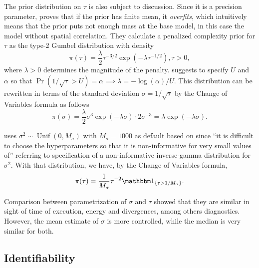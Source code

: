 The prior distribution on $\tau$ is also subject to discussion. Since it is a
precision parameter, \textcite[p. 9, Theorem 1]{simpson2017penalising} proves
that if the prior has finite mean, it {\em overfits}, which intuitively means
that the prior puts not enough mass at the base model, in this case the model
without spatial correlation. They calculate a penalized complexity prior for
$\tau$ as the type-2 Gumbel distribution with density 
\begin{equation}
  \label{eq:gumbel-distribution}
  \pi(\tau) = \frac{\lambda}{2}\tau^{-3/2}\exp(-\lambda \tau^{-1/2}), \tau > 0, 
\end{equation}
where $\lambda > 0$ determines the magnitude of the penalty.
\textcite[p. 9]{simpson2017penalising} suggests to specify $U$ and
$\alpha$ so that $\Pr(1 / \sqrt{\tau} > U) = \alpha \implies \lambda =
-\log(\alpha)/U$. This distribution can be rewritten in terms of the standard
deviation $\sigma = 1/ \sqrt{\tau}$ by the Change of Variables
formula as follows
\begin{equation}
  \label{eq:standard-deviation-gumbel}
  \pi(\sigma) = \frac{\lambda}{2}\sigma^{3}\exp(-\lambda \sigma) \cdot 2\sigma^{-3} = \lambda \exp(-\lambda \sigma). 
\end{equation}

\textcite[p. 5]{lee2013carbayes} uses $\sigma^2 \sim \operatorname{Unif}(0,
M_{\sigma})$ with $M_{\sigma} = 1000$ as default based on
\textcite{gelman2006prior} since ``it is difficult to choose the
hyperparameters so that it is non-informative for very small values of''
\cite[p. 4]{lee2013carbayes} referring to specification of a non-informative
inverse-gamma distribution for $\sigma^2$. With that distribution, we
have, by the Change of Variables formula, 
$$
\pi(\tau) = \frac{1}{M_{\sigma}}\tau^{-2}\ind_{\{\tau > 1/M_{\sigma}\}}.
$$

Comparison between parametrization of $\sigma$ and $\tau$ showed that they are
similar in sight of time of execution, energy and divergences, among others
diagnostics. However, the mean estimate of $\sigma$ is more controlled, while 
the median is very similar for both.

\subsection{Identifiability}

